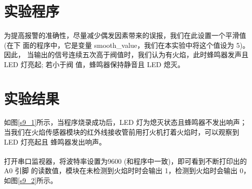 \documentclass[UTF8, oneside]{ctexbook}
\begin{document}
\section{实验程序}

\paragraph{}
为提高报警的准确性，尽量减少偶发因素带来的误报，我们在此设置一个平滑值 (在下
面的程序中，它是变量 smooth\_value，我们在本实验中将这个值设为 5)。因此，
当输出的信号连续五次高于阀值时，我们认为有火焰，此时蜂鸣器发声且 LED 灯亮起; 若小于阀
值，蜂鸣器保持静音且 LED 熄灭。



\section{实验结果}
\paragraph{}
如图\ref{s9_1}所示，当程序烧录成功后，LED 灯为熄灭状态且蜂鸣器不发出响声；
当我们在火焰传感器模块的红外线接收管前用打火机打着火焰时，可以观察到 LED 灯亮起且
蜂鸣器发出响声。

\paragraph{}
打开串口监视器，将波特率设置为9600 (和程序中一致)，即可看到不断打印出的 A0 引脚
的读数值，模块在未检测到火焰时时会输出 1，检测到火焰时会输出 0，如图\ref{s9_2}所示。
\end{document}
